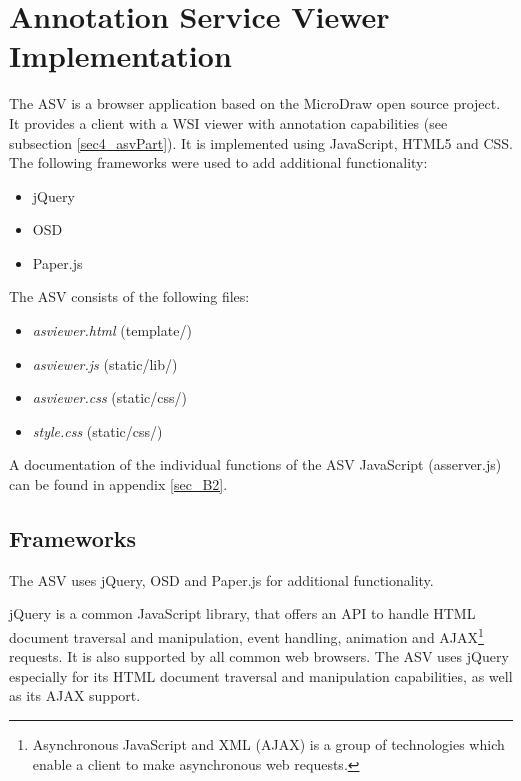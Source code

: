 \section{Annotation Service Viewer Implementation}

The ASV is a browser application based on the MicroDraw open source project. It provides a client with a WSI viewer with annotation capabilities (see subsection \ref{sec4_asvPart}). It is implemented using JavaScript, HTML5 and CSS. The following frameworks were used to add additional functionality:

\begin{itemize}
	\item jQuery
	\item OSD
	\item Paper.js
\end{itemize}

The ASV consists of the following files:

\begin{itemize}
	\item \emph{as{\textunderscore}viewer.html} (template/)
	\item \emph{as{\textunderscore}viewer.js} (static/lib/)
	\item \emph{as{\textunderscore}viewer.css} (static/css/)
	\item \emph{style.css} (static/css/)
\end{itemize}

A documentation of the individual functions of the ASV JavaScript (as{\textunderscore}server.js) can be found in appendix \ref{sec_B2}.

\subsection{Frameworks}
The ASV uses jQuery, OSD and Paper.js for additional functionality.

jQuery is a common JavaScript library, that offers an API to handle HTML document traversal and manipulation, event handling, animation and AJAX\footnote{
	Asynchronous JavaScript and XML (AJAX) is a group of technologies which enable a client to make asynchronous web requests\cite{Ullman07}.
} requests\cite{web:jquery}. It is also supported by all common web browsers\cite{web:jqueryBS}. The ASV uses jQuery especially for its HTML document traversal and manipulation capabilities, as well as its AJAX support.

